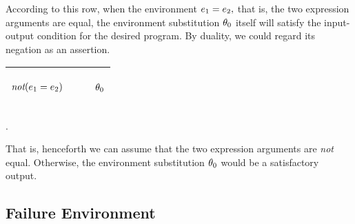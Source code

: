\documentclass[runningheads]{llncs}
\DeclareMathOperator{\unot}{\emph{not}\kern-.0pt}
\begin{document}
According to this row, when the environment  $e_{1} = e_{2},$ that is, the two expression arguments are equal,  the environment substitution  $\theta_{0}$ itself will satisfy the input-output condition for the desired program.  By duality, we could regard its negation as an assertion.
\begin{center}
\begin{tabular}{T}
 \hline 
  \begin{center}
${\begin{aligned} 
&\begin{aligned}
\unot (\e{1} = \e{2})
\end{aligned}\end{aligned}}$\hspace{2cm} 
\end{center} 
  & 
 & \begin{center}$\theta_{0}$ \end{center} \\
\hline
\end{tabular}.
\end{center}
That is, henceforth we can assume that the two expression arguments are \emph{not} equal. Otherwise, the environment substitution $\theta_{0}$ would be a satisfactory output.

\subsection{Failure Environment}
\end{document}
